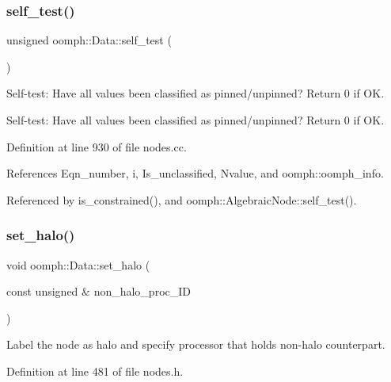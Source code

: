 \mbox{\label{classoomph_1_1Data_ae43b63b56afb8574db6da68f85802f80}} 
\subsubsection{\texorpdfstring{self\+\_\+test()}{self\_test()}}
{\footnotesize\ttfamily unsigned oomph\+::\+Data\+::self\+\_\+test (\begin{DoxyParamCaption}{ }\end{DoxyParamCaption})}



Self-\/test\+: Have all values been classified as pinned/unpinned? Return 0 if OK. 

Self-\/test\+: Have all values been classified as pinned/unpinned? Return 0 if OK. 

Definition at line 930 of file nodes.\+cc.



References Eqn\+\_\+number, i, Is\+\_\+unclassified, Nvalue, and oomph\+::oomph\+\_\+info.



Referenced by is\+\_\+constrained(), and oomph\+::\+Algebraic\+Node\+::self\+\_\+test().

\mbox{\label{classoomph_1_1Data_ac96b285ae3f1ce549807072b652573bf}} 
\subsubsection{\texorpdfstring{set\+\_\+halo()}{set\_halo()}}
{\footnotesize\ttfamily void oomph\+::\+Data\+::set\+\_\+halo (\begin{DoxyParamCaption}\item[{const unsigned \&}]{non\+\_\+halo\+\_\+proc\+\_\+\+ID }\end{DoxyParamCaption})\hspace{0.3cm}{\ttfamily [inline]}}



Label the node as halo and specify processor that holds non-\/halo counterpart. 



Definition at line 481 of file nodes.\+h.




